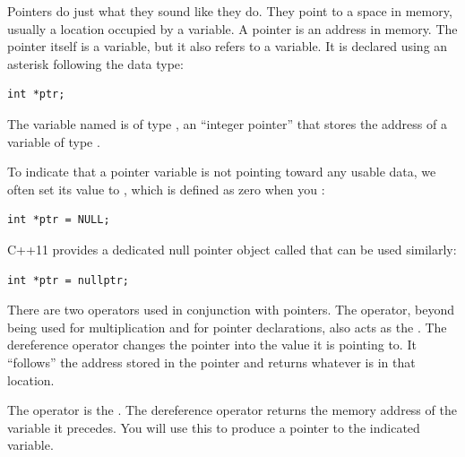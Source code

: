 
Pointers do just what they sound like they do. 
They point to a space in memory, usually a location occupied by a variable. 
A pointer is an address in memory. 
The pointer itself is a variable, but it also refers to a variable. 
It is declared using an asterisk following the data type:

\noindent\begin{minipage}{\linewidth}\begin{lstlisting}
int *ptr; 
\end{lstlisting}\end{minipage}

The variable named  is of type , an ``integer pointer'' that stores the address of a variable of type .

To indicate that a pointer variable is not pointing toward any usable data, we often set its value to , which is defined as zero when you :

\noindent\begin{minipage}{\linewidth}\begin{lstlisting}
int *ptr = NULL;
\end{lstlisting}\end{minipage}

C++11 provides a dedicated null pointer object called  that can be used similarly:

\noindent\begin{minipage}{\linewidth}\begin{lstlisting}
int *ptr = nullptr;
\end{lstlisting}\end{minipage}

There are two operators used in conjunction with pointers. 
The \Code{*} operator, beyond being used for multiplication and for pointer declarations, also acts as the . 
The dereference operator changes the pointer into the value it is pointing to.
It ``follows'' the address stored in the pointer and returns whatever is in that location.

The \Code{\&} operator is the . 
The dereference operator returns the memory address of the variable it precedes. 
You will use this to produce a pointer to the indicated variable.

